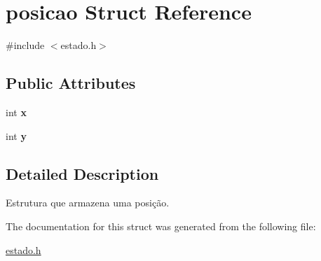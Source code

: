 \hypertarget{structposicao}{}\section{posicao Struct Reference}
\label{structposicao}


{\ttfamily \#include $<$estado.\+h$>$}

\subsection*{Public Attributes}
\begin{DoxyCompactItemize}
\item 
\mbox{\label{structposicao_a1eb052712bec40500df44ab9df72fb46}} 
int {\bfseries x}
\item 
\mbox{\label{structposicao_a320c585fc5fc89e24a219513f27c680b}} 
int {\bfseries y}
\end{DoxyCompactItemize}


\subsection{Detailed Description}
Estrutura que armazena uma posição. 

The documentation for this struct was generated from the following file\+:\begin{DoxyCompactItemize}
\item 
\hyperlink{estado_8h}{estado.\+h}\end{DoxyCompactItemize}
